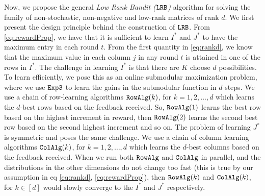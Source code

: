 
Now, we propose the general \emph{Low Rank Bandit (${\tt LRB}$)} algorithm for solving the family of non-stochastic, non-negative and low-rank matrices of rank $d$. We first present the design principle behind the construction of ${\tt LRB}$.  From \eqref{eq:rewardProp}, we have that it is sufficient to learn $I^\ast$ and $J^\ast$ to have the maximum entry in each round $t$. From the first quantity in \eqref{eq:rankd}, we know that the maximum value in each column $j$ in any round $t$ is attained in one of the rows in $I^\ast$. The challenge in learning $I^\ast$ is that there are $K$ choose $d$ possibilities. To learn efficiently, we pose this as an online submodular maximization problem, where we use ${\tt Exp3}$ to learn the gains in the submodular function in $d$ steps. We use a chain of row-learning algorithms ${\tt RowAlg}(k)$, for $k=1,2,\ldots,d$ which learns the $d$-best rows based on the feedback received. So, ${\tt RowAlg}(1)$ learns the best row based on the highest increment in reward, then ${\tt RowAlg}(2)$ learns the second best row based on the second highest increment and so on. The problem of learning $J^\ast$ is symmetric and poses the same challenge. We use a chain of column learning algorithms ${\tt ColAlg}(k)$, for $k=1,2,\ldots,d$ which learns the $d$-best columns based on the feedback received. When we run both ${\tt RowAlg}$ and ${\tt ColAlg}$ in parallel, and the distributions in the other dimensions do not change too fast (this is true by our assumption in eq \eqref{eq:rankd}, \eqref{eq:rewardProp}), then ${\tt RowAlg}(k)$ and ${\tt ColAlg}(k)$, for $k\in [d]$ would slowly converge to the $I^\ast$ and $J^\ast$ respectively.



